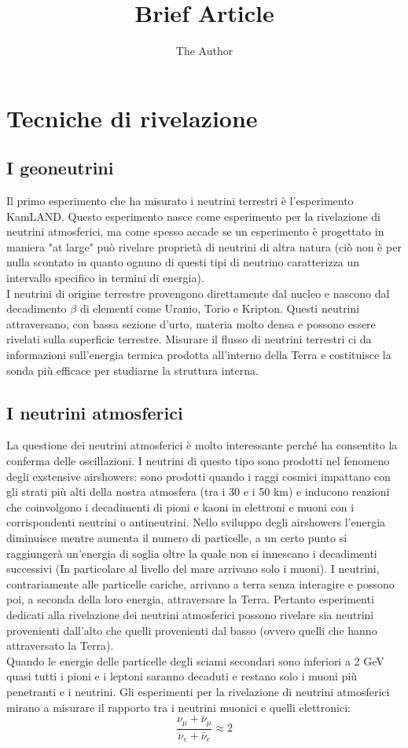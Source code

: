 \documentclass[11pt, oneside]{article}   	%
\title{Brief Article}
\author{The Author}
\begin{document}
\section{Tecniche di rivelazione}
\subsection{I geoneutrini}
Il primo esperimento che ha misurato i neutrini terrestri è l'esperimento KamLAND. Questo esperimento nasce come esperimento per la rivelazione di neutrini atmosferici, ma come spesso accade se un esperimento è progettato in  maniera "at large" può rivelare proprietà di neutrini di altra natura (ciò non è per nulla scontato in quanto ognuno di questi tipi di neutrino caratterizza un intervallo specifico in termini di energia).\\
I neutrini di origine terrestre provengono direttamente dal nucleo e nascono dal decadimento $\beta$ di elementi come Uranio, Torio e Kripton. Questi neutrini attraversano, con bassa sezione d'urto, materia molto densa e possono essere rivelati sulla superficie terrestre. Misurare il flusso di neutrini terrestri ci da informazioni sull'energia termica prodotta all'interno della Terra e costituisce la sonda più efficace per studiarne la struttura interna.\\


\subsection{I neutrini atmosferici}
La questione dei neutrini atmosferici è molto interessante perché ha consentito la conferma delle oscillazioni. I neutrini di questo tipo sono prodotti nel fenomeno degli exstensive airshowers: sono prodotti quando i raggi cosmici impattano con gli strati più alti della nostra atmosfera (tra i 30 e i 50 km) e inducono reazioni che coinvolgono i decadimenti di pioni e kaoni in elettroni e muoni con i corrispondenti neutrini o antineutrini. %
Nello sviluppo degli airshowers l'energia diminuisce mentre aumenta il numero di particelle, a un certo punto si raggiungerà un'energia di soglia oltre la quale non si innescano i decadimenti successivi (In particolare al livello del mare arrivano solo i muoni). I neutrini, contrariamente alle particelle cariche, arrivano a terra senza interagire e possono poi, a seconda della loro energia, attraversare la Terra. Pertanto esperimenti dedicati alla rivelazione dei neutrini atmosferici possono rivelare sia neutrini provenienti dall'alto che quelli provenienti dal basso (ovvero quelli che hanno attraversato la Terra).\\ 
Quando le energie delle particelle degli sciami secondari sono inferiori a 2 GeV quasi tutti i pioni e i leptoni saranno decaduti e restano solo i muoni più penetranti e i neutrini. Gli esperimenti per la rivelazione di neutrini atmosferici mirano a misurare il rapporto tra i neutrini muonici e quelli elettronici: 
\begin{equation} 
   \frac{\nu_\mu + \bar{\nu}_\mu}{\nu_e + \bar{\nu}_e} \approx 2
\end{equation}
\end{document}
